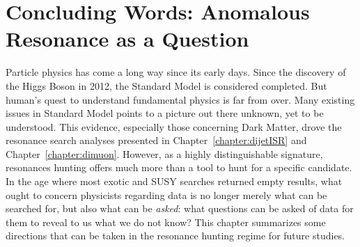 \chapter{Concluding Words: Anomalous Resonance as a Question}




Particle physics has come a long way since its early days. Since the discovery of the Higgs Boson in 2012, the Standard Model is considered completed. But human's quest to understand fundamental physics is far from over. Many existing issues in Standard Model points to a picture out there unknown, yet to be understood. This evidence, especially those concerning Dark Matter, drove the resonance search analyses presented in Chapter~\ref{chapter:dijetISR} and Chapter~\ref{chapter:dimuon}.
However, as a highly distinguishable signature, resonances hunting offers much more than a tool to hunt for a specific candidate. In the age where most exotic and SUSY searches returned empty results, what ought to concern physicists regarding data is no longer merely what can be searched for, but also what can be \textit{asked}: what questions can be asked of data for them to reveal to us what we do not know? This chapter summarizes some directions that can be taken in the resonance hunting regime for future studies.


